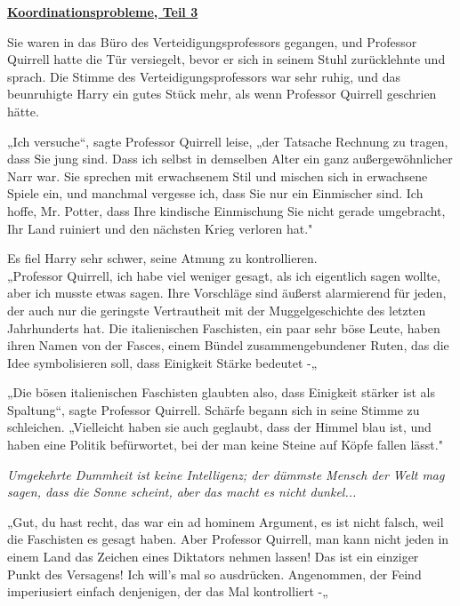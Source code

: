 

\hypertarget{koordinationsprobleme-teil-3}{%

\textbf{\uline{Koordinationsprobleme, Teil 3}}

Sie waren in das Büro des Verteidigungsprofessors gegangen, und Professor Quirrell hatte die Tür versiegelt, bevor er sich in seinem Stuhl zurücklehnte und sprach. Die Stimme des Verteidigungsprofessors war sehr ruhig, und das beunruhigte Harry ein gutes Stück mehr, als wenn Professor Quirrell geschrien hätte.

„Ich versuche“, sagte Professor Quirrell leise, „der Tatsache Rechnung zu tragen, dass Sie jung sind. Dass ich selbst in demselben Alter ein ganz außergewöhnlicher Narr war. Sie sprechen mit erwachsenem Stil und mischen sich in erwachsene Spiele ein, und manchmal vergesse ich, dass Sie nur ein Einmischer sind. Ich hoffe, Mr. Potter, dass Ihre kindische Einmischung Sie nicht gerade umgebracht, Ihr Land ruiniert und den nächsten Krieg verloren hat."

Es fiel Harry sehr schwer, seine Atmung zu kontrollieren.\\ „Professor Quirrell, ich habe viel weniger gesagt, als ich eigentlich sagen wollte, aber ich musste etwas sagen. Ihre Vorschläge sind äußerst alarmierend für jeden, der auch nur die geringste Vertrautheit mit der Muggelgeschichte des letzten Jahrhunderts hat. Die italienischen Faschisten, ein paar sehr böse Leute, haben ihren Namen von der Fasces, einem Bündel zusammengebundener Ruten, das die Idee symbolisieren soll, dass Einigkeit Stärke bedeutet -„

„Die bösen italienischen Faschisten glaubten also, dass Einigkeit stärker ist als Spaltung“, sagte Professor Quirrell. Schärfe begann sich in seine Stimme zu schleichen. „Vielleicht haben sie auch geglaubt, dass der Himmel blau ist, und haben eine Politik befürwortet, bei der man keine Steine auf Köpfe fallen lässt."

\emph{Umgekehrte Dummheit ist keine Intelligenz; der dümmste Mensch der Welt mag sagen, dass die Sonne scheint, aber das macht es nicht dunkel...}

„Gut, du hast recht, das war ein ad hominem Argument, es ist nicht falsch, weil die Faschisten es gesagt haben. Aber Professor Quirrell, man kann nicht jeden in einem Land das Zeichen eines Diktators nehmen lassen! Das ist ein einziger Punkt des Versagens! Ich will's mal so ausdrücken. Angenommen, der Feind imperiusiert einfach denjenigen, der das Mal kontrolliert -„

}
